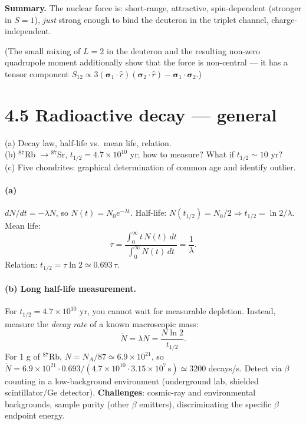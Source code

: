 \documentclass[11pt]{article}
\newcommand{\Q}[1]{\begin{question}#1\end{question}}
\begin{document}
\textbf{Summary.} The nuclear force is: short-range, attractive, spin-dependent (stronger in $S=1$), \emph{just} strong enough to bind the deuteron in the triplet channel, charge-independent.

(The small mixing of $L=2$ in the deuteron and the resulting non-zero quadrupole moment additionally show that the force is non-central --- it has a tensor component $S_{12}\propto 3(\boldsymbol{\sigma}_1\!\cdot\!\hat r)(\boldsymbol{\sigma}_2\!\cdot\!\hat r)-\boldsymbol{\sigma}_1\!\cdot\!\boldsymbol{\sigma}_2$.)

\section*{4.5 \quad Radioactive decay --- general}

\Q{(a) Decay law, half-life vs.\ mean life, relation.\\
(b) $^{87}$Rb $\to {}^{87}$Sr, $t_{1/2}=4.7\times 10^{10}$ yr; how to measure? What if $t_{1/2}\sim 10$ yr?\\
(c) Five chondrites: graphical determination of common age and identify outlier.}

\paragraph{(a)} $dN/dt=-\lambda N$, so $N(t)=N_0 e^{-\lambda t}$. Half-life: $N(t_{1/2})=N_0/2 \Rightarrow t_{1/2}=\ln 2/\lambda$. Mean life:
\[
\tau=\frac{\int_0^\infty t\,N(t)\,dt}{\int_0^\infty N(t)\,dt}=\frac{1}{\lambda}.
\]
Relation: $t_{1/2}=\tau\ln 2\simeq 0.693\,\tau$.

\paragraph{(b) Long half-life measurement.} For $t_{1/2}=4.7\times 10^{10}$ yr, you cannot wait for measurable depletion. Instead, measure the \emph{decay rate} of a known macroscopic mass:
\[
\dot N=\lambda N=\frac{N\ln 2}{t_{1/2}}.
\]
For 1 g of $^{87}$Rb, $N=N_A/87\simeq 6.9\times 10^{21}$, so $\dot N=6.9\times 10^{21}\cdot 0.693/(4.7\times 10^{10}\cdot 3.15\times 10^{7}\,\mathrm{s})\simeq 3200$ decays/s. Detect via $\beta$ counting in a low-background environment (underground lab, shielded scintillator/Ge detector). \textbf{Challenges}: cosmic-ray and environmental backgrounds, sample purity (other $\beta$ emitters), discriminating the specific $\beta$ endpoint energy.
\end{document}
